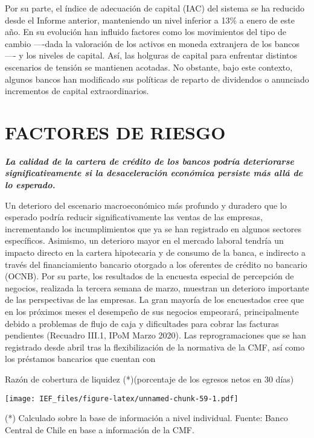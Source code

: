 \documentclass[
]{book}
\begin{document}
Por su parte, el índice de adecuación de capital (IAC) del sistema se ha reducido
desde el Informe anterior, manteniendo un nivel inferior a 13\% a enero de
este año. En su evolución han influido factores como los movimientos del tipo
de cambio ----dada la valoración de los activos en moneda extranjera de los
bancos---- y los niveles de capital. Así, las holguras de capital para enfrentar
distintos escenarios de tensión se mantienen acotadas. No obstante, bajo este
contexto, algunos bancos han modificado sus políticas de reparto de dividendos
o anunciado incrementos de capital extraordinarios.

\hypertarget{FR}{%
\section*{FACTORES DE RIESGO}\label{FR}}

\textbf{\emph{La calidad de la cartera de crédito de los bancos podría deteriorarse significativamente si la desaceleración económica persiste más allá de lo esperado.}}

Un deterioro del escenario macroeconómico más profundo y duradero que
lo esperado podría reducir significativamente las ventas de las empresas,
incrementando los incumplimientos que ya se han registrado en algunos
sectores específicos. Asimismo, un deterioro mayor en el mercado laboral
tendría un impacto directo en la cartera hipotecaria y de consumo de la banca,
e indirecto a través del financiamiento bancario otorgado a los oferentes de
crédito no bancario (OCNB).
Por su parte, los resultados de la encuesta especial de percepción de negocios,
realizada la tercera semana de marzo, muestran un deterioro importante de las
perspectivas de las empresas. La gran mayoría de los encuestados cree que en
los próximos meses el desempeño de sus negocios empeorará, principalmente
debido a problemas de flujo de caja y dificultades para cobrar las facturas
pendientes (Recuadro III.1, IPoM Marzo 2020).
Las reprogramaciones que se han registrado desde abril tras la flexibilización
de la normativa de la CMF, así como los préstamos bancarios que cuentan con

Razón de cobertura de liquidez (*)(porcentaje de los egresos netos en 30 días)

\texttt{[image: IEF\_files/figure-latex/unnamed-chunk-59-1.pdf]}

(*) Calculado sobre la base de información a nivel individual.
Fuente: Banco Central de Chile en base a información de la CMF.
\end{document}
